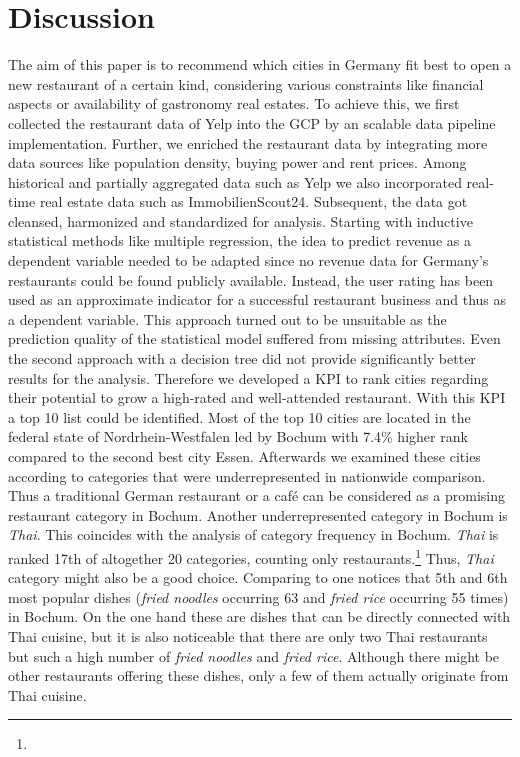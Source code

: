 \section{Discussion}
\label{sec:discussion}
The aim of this paper is to recommend which cities in Germany fit best to open a new restaurant of a certain kind, considering various constraints like financial aspects or availability of gastronomy real estates. To achieve this, we first collected the restaurant data of Yelp into the \ac{GCP} by an scalable data pipeline implementation. Further, we enriched the restaurant data by integrating more data sources like population density, buying power and rent prices. 
Among historical and partially aggregated data such as Yelp we also incorporated real-time real estate data such as ImmobilienScout24. Subsequent, the data got cleansed, harmonized and standardized for analysis. \newline
Starting with inductive statistical methods like multiple regression, the idea to predict revenue as a dependent variable needed to be adapted since no revenue data for Germany's restaurants could be found publicly available. Instead, the user rating has been used as an approximate indicator for a successful restaurant business and thus as a dependent variable. This approach turned out to be unsuitable as the prediction quality of the statistical model suffered from missing attributes. Even the second approach with a decision tree did not provide significantly better results for the analysis. Therefore we developed a \ac{KPI} to rank cities regarding their potential to grow a high-rated and well-attended restaurant. With this \ac{KPI} a top 10 list could be identified. Most of the top 10 cities are located in the federal state of Nordrhein-Westfalen led by Bochum with 7.4\% higher rank compared to the second best city Essen. Afterwards we examined these cities according to categories that were underrepresented in nationwide comparison.
Thus a traditional German restaurant or a café can be considered as a promising restaurant category in Bochum. Another underrepresented category in Bochum is \textit{Thai}. 
This coincides with the analysis of category frequency in Bochum. \textit{Thai} is ranked 17th of altogether 20 categories, counting only restaurants.\footnote{} Thus, \textit{Thai}  category might also be a good choice. Comparing to  one notices that 5th and 6th most popular dishes (\textit{fried noodles} occurring 63 and \textit{fried rice} occurring 55 times) in Bochum. On the one hand these are dishes that can be directly connected with Thai cuisine, but it is also noticeable that there are only two Thai restaurants but such a high number of \textit{fried noodles} and \textit{fried rice}. Although there might be other restaurants offering these dishes, only a few of them actually originate from Thai cuisine.%
